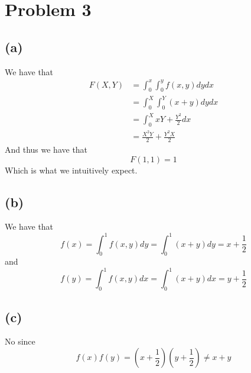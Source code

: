 \section*{Problem 3}
\subsection*{(a)}
We have that
\begin{align*}
    F(X,Y)&=\int_{0}^{x}\int_{0}^{y}f(x,y)dydx\\
    &=\int_{0}^{X}\int_{0}^{Y}(x+y)dydx\\
    &=\int_{0}^{X}xY+\frac{Y^2}{2}dx\\  
    &=\boxed{\frac{X^2Y}{2}+\frac{Y^2X}{2}}
\end{align*}
And thus we have that 
$$F(1,1)=\boxed{1}$$
Which is what we intuitively expect.
\subsection*{(b)}
We have that
$$f(x)=\int_{0}^{1}f(x,y)dy=\int_{0}^{1}(x+y)dy=\boxed{x+\frac{1}{2}}$$
and 
$$f(y)=\int_{0}^{1}f(x,y)dx=\int_{0}^{1}(x+y)dx=\boxed{y+\frac{1}{2}}$$
\subsection*{(c)}
No since 
$$f(x)f(y)=(x+\frac{1}{2})(y+\frac{1}{2})\neq x+y$$




